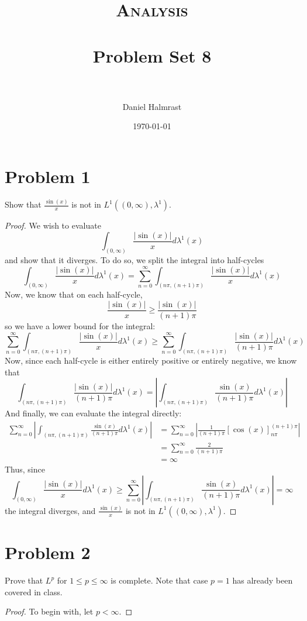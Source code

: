 \documentclass[fontsize=11pt]{scrartcl} %
\title{	
\normalfont \normalsize 
\textsc{Analysis} \\ [25pt] %
\horrule{0.5pt} \\[0.4cm] %
\huge Problem Set 8 \\ %
\horrule{2pt} \\[0.5cm] %
}
\author{Daniel Halmrast} %
\date{\normalsize\today} %
\numberwithin{equation}{section} %
\numberwithin{figure}{section} %
\numberwithin{table}{section} %
\begin{document}
\maketitle %

\section*{Problem 1}
Show that $\frac{\sin(x)}{x}$ is not in $L^1((0,\infty),\lambda^1)$.
\\
\begin{proof}
We wish to evaluate
    \[
        \int_{(0,\infty)}\frac{|\sin(x)|}{x}d\lambda^1(x)
    \]
    and show that it diverges. To do so, we split the integral into half-cycles
    \[
        \int_{(0,\infty)}\frac{|\sin(x)|}{x}d\lambda^1(x) = 
        \sum_{n=0}^{\infty} \int_{(n\pi,(n+1)\pi)}\frac{|\sin(x)|}{x}d\lambda^1(x)
    \]
    Now, we know that on each half-cycle,
    \[
        \frac{|\sin(x)|}{x} \geq \frac{|\sin(x)|}{(n+1)\pi}
    \]
    so we have a lower bound for the integral:
    \[
        \sum_{n=0}^{\infty}
        \int_{(n\pi,(n+1)\pi)}\frac{|\sin(x)|}{x}d\lambda^1(x)\geq
        \sum_{n=0}^{\infty}
        \int_{(n\pi,(n+1)\pi)}\frac{|\sin(x)|}{(n+1)\pi}d\lambda^1(x)
    \]
    Now, since each half-cycle is either entirely positive or entirely negative,
    we know that
    \[
        \int_{(n\pi,(n+1)\pi)}\frac{|\sin(x)|}{(n+1)\pi}d\lambda^1(x)=
        \left|\int_{(n\pi,(n+1)\pi)}\frac{\sin(x)}{(n+1)\pi}d\lambda^1(x)\right|
    \]
    And finally, we can evaluate the integral directly:
    \[
        \begin{aligned}
        \sum_{n=0}^{\infty}
        \left|\int_{(n\pi,(n+1)\pi)}\frac{\sin(x)}{(n+1)\pi}d\lambda^1(x)\right|
            &=
        \sum_{n=0}^{\infty}
            \left|\frac{1}{(n+1)\pi}[\cos(x)]_{n\pi}^{(n+1)\pi}\right|\\
            &=
        \sum_{n=0}^{\infty}
            \frac{2}{(n+1)\pi}\\
            &=\infty
        \end{aligned}
    \]
    Thus, since 
    \[
        \int_{(0,\infty)}\frac{|\sin(x)|}{x}d\lambda^1(x)\geq
        \sum_{n=0}^{\infty}
        \left|\int_{(n\pi,(n+1)\pi)}\frac{\sin(x)}{(n+1)\pi}d\lambda^1(x)\right|
        = \infty
    \]
    the integral diverges, and $\frac{\sin(x)}{x}$ is not in
    $L^1((0,\infty),\lambda^1)$.
\end{proof}

\newpage

\section*{Problem 2}
Prove that $L^p$ for $1\leq p\leq\infty$ is complete. Note that case $p=1$ has
already been covered in class.
\\
\begin{proof}
To begin with, let $p<\infty$. 
\end{proof}
\end{document}
